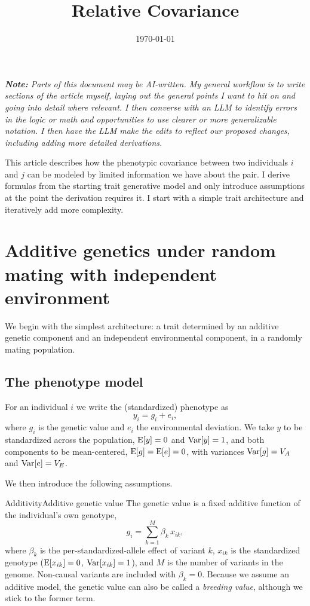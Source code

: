 \documentclass[12pt]{article}
\title{Relative Covariance}
\date{\today}
\begin{document}
\maketitle

\textit{\textbf{Note:}
Parts of this document may be AI-written.
My general workflow is to write sections of the article myself, laying out the general points I want to hit on and going into detail where relevant.
I then converse with an LLM to identify errors in the logic or math and opportunities to use clearer or more generalizable notation.
I then have the LLM make the edits to reflect our proposed changes, including adding more detailed derivations.}

This article describes how the phenotypic covariance between two individuals $i$ and $j$ can be modeled by limited information we have about the pair.
I derive formulas from the starting trait generative model and only introduce assumptions at the point the derivation requires it.
I start with a simple trait architecture and iteratively add more complexity.

\section{Additive genetics under random mating with independent environment}\label{sec:random-mating}
We begin with the simplest architecture: a trait determined by an additive genetic component and an independent environmental component, in a randomly mating population.

\subsection{The phenotype model}
For an individual $i$ we write the (standardized) phenotype as
\begin{equation}\label{eq:model}
    y_i = g_i + e_i ,
\end{equation}
where $g_i$ is the genetic value and $e_i$ the environmental deviation.
We take $y$ to be standardized across the population, $\mathrm{E}[y]=0$ and $\mathrm{Var}[y]=1$, and both components to be mean-centered, $\mathrm{E}[g]=\mathrm{E}[e]=0$, with variances $\mathrm{Var}[g]=V_A$ and $\mathrm{Var}[e]=V_E$.

We then introduce the following assumptions.

\begin{assumption}{Additivity}{Additive genetic value}
The genetic value is a fixed additive function of the individual's own genotype,
$$ g_i = \sum_{k=1}^{M} \beta_k\, x_{ik} , $$
where $\beta_k$ is the per-standardized-allele effect of variant $k$, $x_{ik}$ is the standardized genotype ($\mathrm{E}[x_{ik}]=0$, $\mathrm{Var}[x_{ik}]=1$), and $M$ is the number of variants in the genome.
Non-causal variants are included with $\beta_k=0$.
Because we assume an additive model, the genetic value can also be called a \emph{breeding value}, although we stick to the former term.
\end{assumption}
\end{document}
